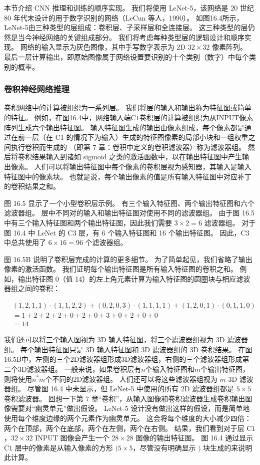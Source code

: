 本节介绍 CNN 推理和训练的顺序实现。 我们将使用 LeNet-5，该网络是 20 世纪 80 年代末设计的用于数字识别的网络（LeCun 等人，1990）。 如图16.4所示，LeNet-5由三种类型的层组成：卷积层、子采样层和全连接层。 这三种类型的层仍然是当今神经网络的关键组成部分。 我们将考虑每种类型层的逻辑设计和顺序实现。 网络的输入显示为灰色图像，其中手写数字表示为 2D $32 \times 32$ 像素阵列。 最后一层计算输出，即原始图像属于网络设置要识别的十个类别（数字）中每个类别的概率。

\subsubsection{卷积神经网络推理}
卷积网络中的计算被组织为一系列层。 我们将层的输入和输出称为特征图或简单的特征。 例如，在图16.4中，网络输入端$\mathrm{C} 1$卷积层的计算被组织为从INPUT像素阵列生成六个输出特征图。 输入特征图生成的输出由像素组成，每个像素都是通过在前一层（在 C1 的情况下为输入）生成的特征图像素的局部小块和一组权重之间执行卷积而生成的 （即第 7 章：卷积中定义的卷积滤波器）称为滤波器组。 然后将卷积结果输入到诸如 sigmoid 之类的激活函数中，以在输出特征图中产生输出像素。 人们可以将输出特征图中每个像素的卷积层视为感知器，其输入是输入特征图中的像素块。 也就是说，每个输出像素的值是所有输入特征图中对应补丁的卷积结果之和。

图 16.5 显示了一个小型卷积层示例。 有三个输入特征图、两个输出特征图和六个滤波器组。 层中不同对的输入和输出特征图对使用不同的滤波器组。 由于图 16.5 中有三个输入特征图和两个输出特征图，因此我们需要 $3 \times 2=6$ 滤波器组。 对于图 16.4 中 LeNet 的 C3 层，有 6 个输入特征图和 16 个输出特征图。 因此，$\mathrm{C} 3$ 中总共使用了 $6 \times 16=96$ 个滤波器组。

图 16.5B 说明了卷积层完成的计算的更多细节。 为了简单起见，我们省略了输出像素的激活函数。 我们证明每个输出特征图是所有输入特征图的卷积之和。 例如，输出特征图 0（值 14）的左上角元素计算为输入特征图的圆圈块与相应滤波器组之间的卷积：

$$
\begin{aligned}
& (1,2,1,1) \cdot(1,1,2,2)+(0,2,0,3) \cdot(1,1,1,1)+(1,2,0, 1) \cdot(0,1,1,0) \\
& =1+2+2+2+0+2+0+3+0+2+0+0 \\
&=14
\end{aligned}
$$

我们还可以将三个输入图视为 3D 输入特征图，将三个滤波器组视为 3D 滤波器组。 每个输出特征图只是 $3 \mathrm{D}$ 输入特征图和 $3 \mathrm{D}$ 滤波器组的 3D 卷积结果。 在图16.5B中，左侧的三个2D滤波器组形成3D滤波器组，右侧的三个滤波器组形成第二个3D滤波器组。 一般来说，如果卷积层有$n$个输入特征图和$m$个输出特征图，则将使用$n^{*} m$个不同的2D滤波器组。 人们还可以将这些滤波器组视为 $m$ 3D 滤波器组。 尽管图 16.4 中未显示，但 LeNet-5 中使用的所有 2D 滤波器组都是 $5 \times 5$ 卷积滤波器。 回想一下第 7 章“卷积”，从输入图像和卷积滤波器生成卷积输出图像需要对“幽灵单元”做出假设。 LeNet-5 设计没有做出这样的假设，而是简单地使用每个维度边缘的两个元素作为幽灵单元。 这会将每个维度的大小减少四倍：两个在顶部，两个在底部，两个在左侧，两个在右侧。 结果，我们看到对于层 $\mathrm{C} 1$，$32 \times 32$ INPUT 图像会产生一个 $28 \times 28$ 图像的输出特征图。 图 16.4 通过显示 $\mathrm{C} 1$ 层中的像素是从输入像素的方形 $(5 \times 5$，尽管没有明确显示 $)$ 块生成的来说明此计算。

